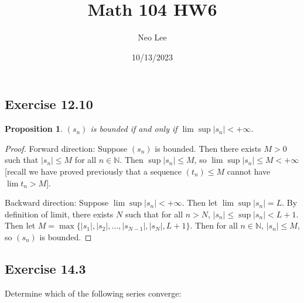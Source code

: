 \documentclass{article}
\title{Math 104 HW6}
\author{Neo Lee}
\date{10/13/2023}
\newtheorem{proposition}[thm]{Proposition}
\begin{document}
 

\maketitle 

\subsection*{Exercise 12.10}
\begin{proposition}
    $(s_n)$ is bounded if and only if $\lim \sup|s_n|<+\infty$.
\end{proposition}
\begin{proof}
    Forward direction: Suppose $(s_n)$ is bounded. Then there exists $M>0$ such that $|s_n|\leq M$ 
    for all $n\in\mathbb{N}$. Then $\sup|s_n|\leq M$, so $\lim\sup|s_n|\leq M<+\infty$ [recall 
    we have proved previously that a sequence $(t_n)\le M$ cannot have $\lim t_n>M$].

    Backward direction: Suppose $\lim\sup|s_n|<+\infty$. Then let $\lim \sup|s_n|=L$. By definition 
    of limit, there exists $N$ such that for all $n> N$, $|s_n|\le \sup |s_n|<L+1$. Then let 
    $M=\max\{|s_1|,|s_2|,\dots,|s_{N-1}|,|s_N|,L+1\}$. Then for all $n\in\mathbb{N}$, $|s_n|\leq M$, 
    so $(s_n)$ is bounded.
\end{proof}

\subsection*{Exercise 14.3}
Determine which of the following series converge:
\end{document}
